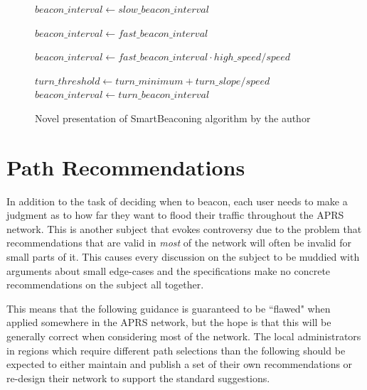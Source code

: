 \begin{figure}[p]
\begin{algorithmic}
	\State $beacon\_interval\gets slow\_beacon\_interval$

\Else
		\State $beacon\_interval\gets fast\_beacon\_interval$    

	\Else
		\State $beacon\_interval\gets fast\_beacon\_interval \cdot high\_speed / speed$

	\EndIf


	\State $turn\_threshold\gets turn\_minimum + turn\_slope / speed$
		\State $beacon\_interval\gets turn\_beacon\_interval$

	\EndIf
\EndIf

	\State {}

\EndIf
\end{algorithmic}
\caption{Novel presentation of SmartBeaconing algorithm by the author}
\label{fig:kwfsmartbeacon}
\end{figure}


\section{Path Recommendations}

In addition to the task of deciding when to beacon,
each user needs to make a judgment as to how far they want to flood their
traffic throughout the APRS network.
This is another subject that evokes controversy due to the problem that
recommendations that
are valid in \emph{most} of the network will often be invalid for small parts
of it.
This causes every discussion on the subject to be muddied with arguments
about small edge-cases and the specifications make no concrete recommendations
on the subject all together.

This means that the following guidance is guaranteed to be ``flawed" when
applied somewhere in the APRS network, but the hope is that this will
be generally correct when considering most of the network.
The local administrators in regions which require different path selections 
than the following should be expected to either 
maintain and publish a set of their own
recommendations or re-design their network to support the standard suggestions.

